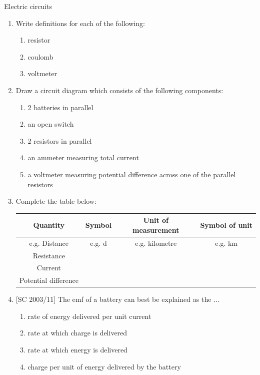 \begin{eocexercises}{Electric circuits}

\begin{enumerate}[noitemsep, label=\textbf{\arabic*}. ] 
\item{ Write definitions for each of the following:
  \begin{enumerate}[noitemsep, label=\textbf{\arabic*}. ] 
  \item resistor
  \item coulomb
  \item voltmeter
  \end{enumerate}}

\item{ Draw a circuit diagram which consists of the following components:
  \begin{enumerate}[noitemsep, label=\textbf{\arabic*}. ] 
  \item 2 batteries in parallel
  \item an open switch
  \item 2 resistors in parallel
  \item an ammeter measuring total current
  \item a voltmeter measuring potential difference across one of the parallel resistors
  \end{enumerate}}

\item{ Complete the table below: \\

\begin{tabular}{ | c | c | c | c| } \hline 
\textbf{Quantity} & \textbf{Symbol} & \textbf{Unit of measurement} & \textbf{Symbol of unit} \\ \hline \hline 
e.g. Distance & e.g. d & e.g. kilometre & e.g. km \\ \hline 
Resistance &   &   &  \\ \hline
Current  &   &   &  \\ \hline
Potential difference  &   &   &  \\ \hline
\hline
\end{tabular}
}

\item{[SC 2003/11] The emf of a battery can best be explained as the $\dots$
\begin{enumerate}[noitemsep, label=\textbf{\arabic*}. ] 
\item{rate of energy delivered per unit current}
\item{rate at which charge is delivered}
\item{rate at which energy is delivered}
\item{charge per unit of energy delivered by the battery}
\end{enumerate}}


\end{enumerate}
\end{eocexercises}
